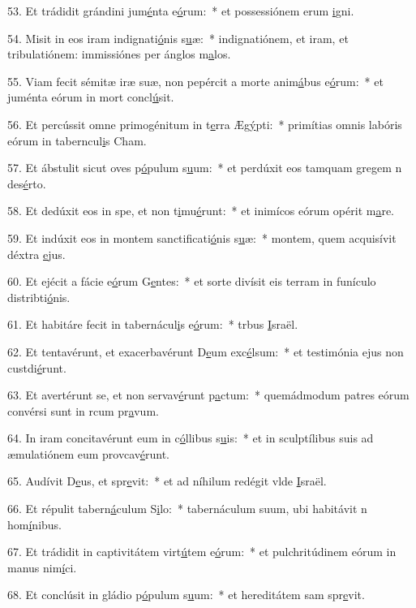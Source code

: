 53. Et trádidit grándini jum\uline{é}nta e\uline{ó}rum:~* et possessiónem erum \uline{i}gni.\par 
54. Misit in eos iram indignati\uline{ó}nis s\uline{u}æ:~* indignatiónem, et iram, et tribulatiónem: immissiónes per ánglos m\uline{a}los.\par 
55. Viam fecit sémitæ iræ suæ, non pepércit a morte anim\uline{á}bus e\uline{ó}rum:~* et juménta eórum in mort concl\uline{ú}sit.\par 
56. Et percússit omne primogénitum in t\uline{e}rra Æg\uline{ý}pti:~* primítias omnis labóris eórum in taberncul\uline{i}s Cham.\par 
57. Et ábstulit sicut oves p\uline{ó}pulum s\uline{u}um:~* et perdúxit eos tamquam gregem n des\uline{é}rto.\par 
58. Et dedúxit eos in spe, et non t\uline{i}mu\uline{é}runt:~* et inimícos eórum opérit m\uline{a}re.\par 
59. Et indúxit eos in montem sanctificati\uline{ó}nis s\uline{u}æ:~* montem, quem acquisívit déxtra \uline{e}jus.\par 
60. Et ejécit a fácie e\uline{ó}rum G\uline{e}ntes:~* et sorte divísit eis terram in funículo distribti\uline{ó}nis.\par 
61. Et habitáre fecit in tabernácul\uline{i}s e\uline{ó}rum:~* trbus \uline{I}sraël.\par 
62. Et tentavérunt, et exacerbavérunt D\uline{e}um exc\uline{é}lsum:~* et testimónia ejus non custdi\uline{é}runt.\par 
63. Et avertérunt se, et non servav\uline{é}runt p\uline{a}ctum:~* quemádmodum patres eórum convérsi sunt in rcum pr\uline{a}vum.\par 
64. In iram concitavérunt eum in c\uline{ó}llibus s\uline{u}is:~* et in sculptílibus suis ad æmulatiónem eum provcav\uline{é}runt.\par 
65. Audívit D\uline{e}us, et spr\uline{e}vit:~* et ad níhilum redégit vlde \uline{I}sraël.\par 
66. Et répulit tabern\uline{á}culum S\uline{i}lo:~* tabernáculum suum, ubi habitávit n hom\uline{í}nibus.\par 
67. Et trádidit in captivitátem virt\uline{ú}tem e\uline{ó}rum:~* et pulchritúdinem eórum in manus nim\uline{í}ci.\par 
68. Et conclúsit in gládio p\uline{ó}pulum s\uline{u}um:~* et hereditátem sam spr\uline{e}vit.\par 
